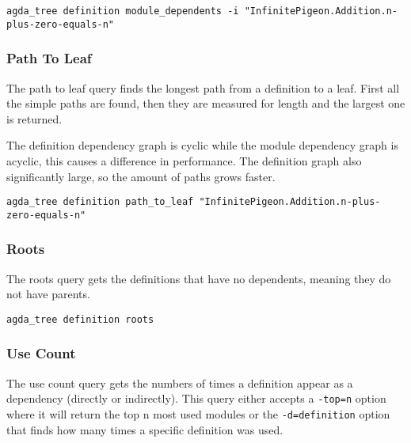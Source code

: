 \noindent
\begin{minipage}{\textwidth}
\begin{lstlisting}
agda_tree definition module_dependents -i "InfinitePigeon.Addition.n-plus-zero-equals-n"
\end{lstlisting}
\end{minipage}

\subsubsection{Path To Leaf}

The path to leaf query finds the longest path from a definition to a leaf.
First all the simple paths are found, then they are measured for length and the
largest one is returned.

The definition dependency graph is cyclic while the module dependency graph is
acyclic, this causes a difference in performance.  The definition graph also
significantly large, so the amount of paths grows faster.

\noindent
\begin{minipage}{\textwidth}
\begin{lstlisting}
agda_tree definition path_to_leaf "InfinitePigeon.Addition.n-plus-zero-equals-n"
\end{lstlisting}
\end{minipage}

\subsubsection{Roots}

The roots query gets the definitions that have no dependents, meaning they do
not have parents.

\noindent
\begin{minipage}{\textwidth}
\begin{lstlisting}
agda_tree definition roots
\end{lstlisting}
\end{minipage}

\subsubsection{Use Count}

The use count query gets the numbers of times a definition appear as a
dependency (directly or indirectly). This query either accepts a
\texttt{-top=n} option where it will return the top n most used modules or the
\texttt{-d=definition} option that finds how many times a specific definition
was used.

